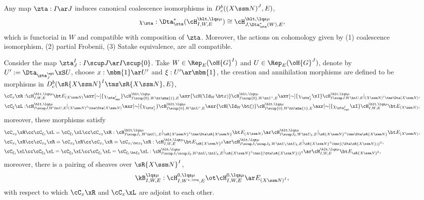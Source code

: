 \documentclass[a4paper, twoside]{article}
\begin{document}
\begin{thm}
	Any map $\zta:I\ar J$ induces canonical coalescence isomorphisms in $D_{c}^{b}({(X\ssm N)}^{J},E)$,
	\[
		\chi_{\zta}:\Dta_{\zta}^{*}(\cH_{I,W,E}^{\blt,\lqs\mu})\cong\cH_{J,\Dta_{\zta}^{*}(W),E}^{\blt,\lqs\mu},
	\]
	which is functorial in $W$ and compatible with composition of $\zta$. Moreover, the actions on cohomology given by (1) coalescence isomorphism, (2) partial Frobenii, (3) Satake equivalence, are all compatible.
\end{thm}

\begin{thm}
	Consider the map $\zta_{J}^{I}:I\scup J\ar I\scup\{0\}$. Take $W\in\Rep_{E}(\oH{G}^{I})$ and $U\in\Rep_{E}(\oH{G}^{J})$, denote by $U':=\Dta_{\zta_{J}^{\ept}}\xS U$, choose $x:\mbm{1}\ar U'$ and $\xi:U'\ar\mbm{1}$, the creation and annihilation morphisms are defined to be morphisms in $D_{c}^{b}(\sR{X\ssm N}^{I}\tms\sR{X\ssm N}, E)$,
	\begin{align*}
	  \cC_{x}\xR:& \cH_{I,W,E}^{\blt,\lqs\mu}\bt E_{(X\ssm N)}\axr[\sim]{\chi_{\zta_{\ept}^{I}}} \cH_{I\scup\{0\},W\bt\mbm{1},E}^{\blt,\lqs\mu}\axr{\cH(\Id_{W}\bt x)}\cH_{I\scup\{0\},W\bt U',E}^{\blt,\lqs\mu}\axr[\sim]{\chi_{\zta_{J}^{I}}\xI}\cH_{I\scup J,W\bt U,E}^{\blt,\lqs\mu}|_{{(X\ssm N)}^{I}\tms\Dta(X\ssm N)},\\
	  \cC_{\xi}\xL:& \cH_{I\scup J,W\bt U,E}^{\blt,\lqs\mu}|_{{(X\ssm N)}^{I}\tms\Dta(X\ssm N)}\axr[\sim]{\chi_{\zta_{J}^{I}}}\cH_{I\scup\{0\},W\bt U',E}^{\blt,\lqs\mu}\axr{\cH(\Id_{W}\bt \xi)}\cH_{I\scup\{0\},W\bt\mbm{1},E}^{\blt,\lqs\mu}\axr[\sim]{\chi_{\zta_{\ept}^{I}}\xI} \cH_{I,W,E}^{\blt,\lqs\mu}\bt E_{(X\ssm N)},
	\end{align*}
	moreover, these morphisms satisfy
	\begin{align*}
	  &\cC_{x_{2}}\xR\cc\cC_{\xi_{1}}\xL=\cC_{\xi_{1}}\xL\cc\cC_{x_{2}}\xR:\cH_{I\scup J_{1},W\bt U_{1},E}^{\blt,\lqs\mu}|_{\sR{X\ssm N}^{I}\tms\Dta\sR{X\ssm N}}\bt E_{(X\ssm N)}\ar\cH_{I\scup J_{2},W\bt U_{2},E}^{\blt,\lqs\mu}|_{\sR{X\ssm N}^{I}\tms\Dta\sR{X\ssm N}}\bt E_{(X\ssm N)}, \\
	  &\cC_{x_{1}}\xR\cc\cC_{x_{2}}\xR=\cC_{x_{2}}\xR\cc\cC_{x_{1}}\xR=\cC_{x_{1}\bt x_{2}}\xR:\cH_{I,W,E}^{\blt,\lqs\mu}\bt E_{\sR{X\ssm N}^{2}}\ar\cH_{I\scup J_{1}\scup J_{2},W\bt U_{1}\bt U_{2},E}^{\blt,\lqs\mu}|_{\sR{X\ssm N}^{I}\tms{(\Dta\sR{X\ssm N})}^{2}}, \\
	  &\cC_{\xi_{1}}\xL\cc\cC_{\xi_{2}}\xL=\cC_{\xi_{2}}\xL\cc\cC_{\xi_{1}}\xL=\cC_{\xi_{1}\bt\xi_{2}}\xL:\cH_{I\scup J_{1}\scup J_{2},W\bt U_{1}\bt U_{2},E}^{\blt,\lqs\mu}|_{\sR{X\ssm N}^{I}\tms{(\Dta\sR{X\ssm N})}^{2}}\ar\cH_{I,W,E}^{\blt,\lqs\mu}\bt E_{\sR{X\ssm N}^{2}},
	\end{align*}
	moreover, there is a pairing of sheaves over $\sR{X\ssm N}^{I}$,
	\[
		\kB_{I,W,E}^{\lqs\mu}:\cH_{I,W^{*,\tta},E}^{0,\lqs\mu}\ot\cH_{I,W,E}^{0,\lqs\mu}\ar E_{{(X\ssm N)}^{I}},
	\]
	with respect to which $\cC_{x}\xR$ and $\cC_{x}\xL$ are adjoint to each other.
\end{thm}
\end{document}
